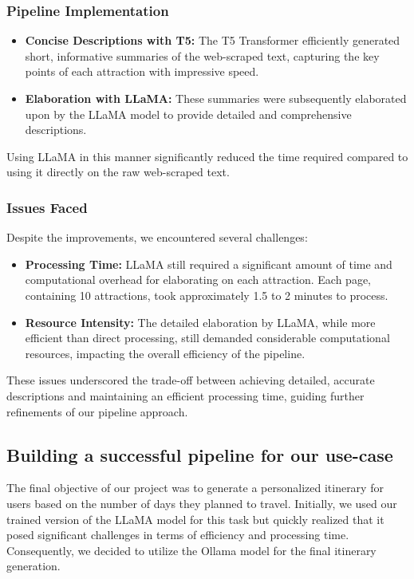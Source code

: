 \documentclass[conference]{IEEEtran}
\begin{document}
        \subsubsection{Pipeline Implementation}
            \begin{itemize}
                \item \textbf{Concise Descriptions with T5:} The T5 Transformer efficiently generated short, informative summaries of the web-scraped text, capturing the key points of each attraction with impressive speed.
                \item \textbf{Elaboration with LLaMA:} These summaries were subsequently elaborated upon by the LLaMA model to provide detailed and comprehensive descriptions.
            \end{itemize}

            Using LLaMA in this manner significantly reduced the time required compared to using it directly on the raw web-scraped text.

        \subsubsection{Issues Faced}
            Despite the improvements, we encountered several challenges:
            \begin{itemize}
                \item \textbf{Processing Time:} LLaMA still required a significant amount of time and computational overhead for elaborating on each attraction. Each page, containing 10 attractions, took approximately 1.5 to 2 minutes to process.
                \item \textbf{Resource Intensity:} The detailed elaboration by LLaMA, while more efficient than direct processing, still demanded considerable computational resources, impacting the overall efficiency of the pipeline.
            \end{itemize}

            These issues underscored the trade-off between achieving detailed, accurate descriptions and maintaining an efficient processing time, guiding further refinements of our pipeline approach.

    \subsection{Building a successful pipeline for our use-case}

        The final objective of our project was to generate a personalized itinerary for users based on the number of days they planned to travel. Initially, we used our trained version of the LLaMA model for this task but quickly realized that it posed significant challenges in terms of efficiency and processing time. Consequently, we decided to utilize the Ollama model for the final itinerary generation.
\end{document}
